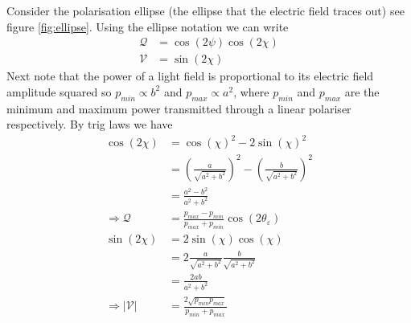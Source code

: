 	Consider the polarisation ellipse (the ellipse that the electric field traces out) see figure \ref{fig:ellipse}. Using the ellipse notation we can write
	\begin{align}
	    \mathcal{Q} &= \cos(2\psi) \cos(2\chi)\\
	    \mathcal{V} &= \sin(2\chi)
	\end{align}
	Next note that the power of a light field is proportional to its electric field amplitude squared so \(p_{min} \propto b^2\) and \(p_{max} \propto a^2\), where \(p_{min}\) and \(p_{max}\) are the minimum and maximum power transmitted through a linear polariser respectively. By trig laws we have 
	\begin{align}
	\cos(2\chi)&=\cos(\chi)^2-2\sin(\chi)^2\\
	&= \left(\frac{a}{\sqrt{a^2+b^2}}\right)^2 - \left(\frac{b}{\sqrt{a^2+b^2}}\right)^2 \\
	&= \frac{a^2-b^2}{a^2+b^2}\\
	\Rightarrow \mathcal{Q}&=\frac{p_{max}-p_{min}}{p_{max}+p_{min}} \cos(2\theta_\varepsilon)\\
	\sin(2\chi) &= 2\sin(\chi)\cos(\chi)\\
	&=2 \frac{a}{\sqrt{a^2+b^2}} \frac{b}{\sqrt{a^2+b^2}}\\
	&=\frac{2ab}{a^2+b^2}\\
	\Rightarrow |\mathcal{V}| &= \frac{2\sqrt{p_{min}p_{max}}}{p_{min}+p_{max}}
	\end{align}


	


 

